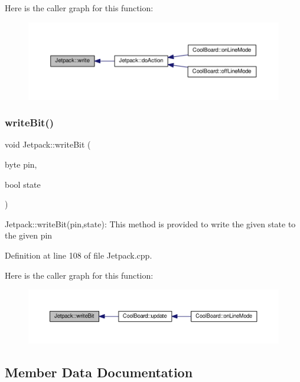 Here is the caller graph for this function\+:\nopagebreak
\begin{figure}[H]
\begin{center}
\leavevmode
\includegraphics[width=350pt]{class_jetpack_a338f1af8cbc6504ac69b47c7328569b5_icgraph}
\end{center}
\end{figure}
\mbox{\label{class_jetpack_a79ae7bc3c1828a0551a7c005c4f8bd00}} 
\subsubsection{\texorpdfstring{write\+Bit()}{writeBit()}}
{\footnotesize\ttfamily void Jetpack\+::write\+Bit (\begin{DoxyParamCaption}\item[{byte}]{pin,  }\item[{bool}]{state }\end{DoxyParamCaption})}

Jetpack\+::write\+Bit(pin,state)\+: This method is provided to write the given state to the given pin 

Definition at line 108 of file Jetpack.\+cpp.

Here is the caller graph for this function\+:\nopagebreak
\begin{figure}[H]
\begin{center}
\leavevmode
\includegraphics[width=350pt]{class_jetpack_a79ae7bc3c1828a0551a7c005c4f8bd00_icgraph}
\end{center}
\end{figure}


\subsection{Member Data Documentation}
\mbox{\label{class_jetpack_aca3142925a7b0834b34ae91d26af7765}} 
